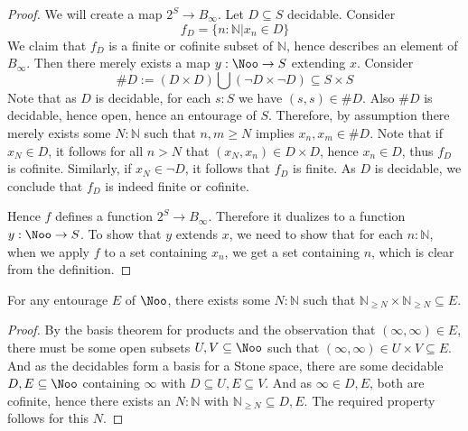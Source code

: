 \begin{proof}
  We will create a map $2^S \to B_\infty$. 
  Let $D\subseteq S$ decidable. Consider $$f_D = \{n : \mathbb N | x_n \in D\}$$ We claim that $f_D$ is a finite or cofinite subset of $\mathbb N$, hence describes an element of $B_\infty$. 
  Then there merely exists a map $y : \Noo \to S$ extending $x$. 
  Consider
  $$
  \# D := (D \times D) \bigcup (\neg D \times \neg D)\subseteq S \times S
  $$
  Note that as $D$ is decidable, for each $s:S$ we have $(s,s)\in \# D$. Also $\#D$ is decidable, hence open, hence an entourage of $S$. 
  Therefore, by assumption there merely exists some $N:\mathbb N$ such that $n,m\geq N$ implies $x_n,x_m \in \#D$. Note that if $x_N \in D$, it follows for all $n>N$ that $(x_N,x_n) \in D\times D$, hence $x_n\in D$, thus $f_D$ is cofinite. 
  Similarly, if $x_N \in \neg D$, it follows that $f_D$ is finite. 
  As $D$ is decidable, we conclude that $f_D$ is indeed finite or cofinite.

  Hence $f$ defines a function $2^S \to B_\infty$. 
  Therefore it dualizes to a function $y:\Noo \to S$. 
  To show that $y$ extends $x$, we need to show that for each $n:\mathbb N$, when we apply $f$ to a set containing $x_n$, we get a set containing $n$, which is clear from the definition. 
\end{proof}

\begin{lemma}
  For any entourage $E$ of $\Noo$, there exists some $N:\mathbb N$ such that $\mathbb N_{\geq N} \times \mathbb N_{\geq N}\subseteq E$. 

\end{lemma} 
\begin{proof}
  By the basis theorem for products and the observation that $(\infty,\infty) \in E$, there must be some open subsets $U,V\subseteq \Noo$ such that $(\infty, \infty) \in U \times V \subseteq E$. And as the decidables form a basis for a Stone space, there are some decidable $D,E\subseteq \Noo$ containing $\infty$ with $D\subseteq U, E \subseteq V$. And as $\infty \in D,E$, both are cofinite, hence there exists an $N:\mathbb N$ with $\mathbb N_{\geq N} \subseteq D,E$. The required property follows for this $N$. 
\end{proof}

